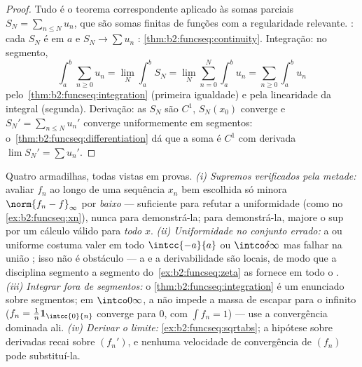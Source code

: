\begin{proof}
Tudo é o teorema correspondente aplicado às somas
parciais $S_N = \sum_{n\leq N}u_n$, que são somas finitas de
funções com a regularidade relevante. : cada $S_N$
é  em $a$ e $S_N \to \sum u_n$ :
\cref{thm:b2:funcseq:continuity}. Integração: no segmento,
\[
\int_a^b \sum_{n\geq0} u_n
= \lim_N \int_a^b S_N
= \lim_N \sum_{n=0}^{N}\int_a^b u_n
= \sum_{n\geq0}\int_a^b u_n
\]
pelo~\cref{thm:b2:funcseq:integration} (primeira igualdade) e pela
linearidade da integral (segunda). Derivação: as
$S_N$ são $C^1$, $S_N(x_0)$ converge e $S_N' =
\sum_{n\leq N}u_n'$ converge uniformemente em segmentos:
o~\cref{thm:b2:funcseq:differentiation} dá que a soma é
$C^1$ com derivada $\lim S_N' = \sum u_n'$.
\end{proof}

\begin{remark}
Quatro armadilhas, todas vistas em provas. \emph{(i)
Supremos verificados pela metade:} avaliar $f_n$ ao longo de uma sequência
$x_n$ bem escolhida só minora $\norm{f_n - f}_\infty$ por
\emph{baixo} --- suficiente para refutar a uniformidade (como no
\cref{ex:b2:funcseq:xn}), nunca para demonstrá-la; para demonstrá-la, majore
o sup por um cálculo válido para \emph{todo} $x$. \emph{(ii)
Uniformidade no conjunto errado:} a  ou uniforme
costuma valer em todo $\intcc{-a}{a}$ ou $\intco\delta\infty$
mas falhar na união ; isso não é obstáculo --- a 
e a derivabilidade são locais, de modo que a disciplina segmento a segmento
do~\cref{ex:b2:funcseq:zeta} as fornece em todo o
. \emph{(iii) Integrar fora de segmentos:} o
\cref{thm:b2:funcseq:integration} é um enunciado sobre
segmentos; em $\intco0\infty$, a  não
impede a massa de escapar para o infinito ($f_n =
\frac1n\mathbf 1_{\intcc{0}{n}}$ converge  para $0$,
com $\int f_n = 1$) --- use a convergência dominada ali.
\emph{(iv) Derivar o limite:}
\cref{ex:b2:funcseq:sqrtabs}; a hipótese sobre derivadas recai sobre
$(f_n')$, e nenhuma velocidade de convergência de $(f_n)$ pode
substituí-la.
\end{remark}

